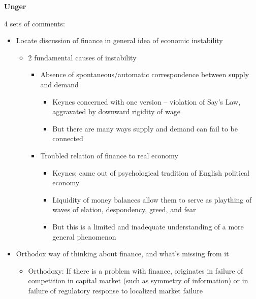 \textbf{Unger}

4 sets of comments:

\begin{itemize}
\tightlist
\item
  Locate discussion of finance in general idea of economic instability

  \begin{itemize}
  \tightlist
  \item
    2 fundamental causes of instability

    \begin{itemize}
    \tightlist
    \item
      Absence of spontaneous/automatic correspondence between supply and
      demand

      \begin{itemize}
      \tightlist
      \item
        Keynes concerned with one version -- violation of Say's Law,
        aggravated by downward rigidity of wage
      \item
        But there are many ways supply and demand can fail to be
        connected
      \end{itemize}
    \item
      Troubled relation of finance to real economy

      \begin{itemize}
      \tightlist
      \item
        Keynes: came out of psychological tradition of English political
        economy
      \item
        Liquidity of money balances allow them to serve as plaything of
        waves of elation, despondency, greed, and fear
      \item
        But this is a limited and inadequate understanding of a more
        general phenomenon
      \end{itemize}
    \end{itemize}
  \end{itemize}
\item
  Orthodox way of thinking about finance, and what's missing from it

  \begin{itemize}
  \tightlist
  \item
    Orthodoxy: If there is a problem with finance, originates in failure
    of competition in capital market (such as symmetry of information)
    or in failure of regulatory response to localized market failure


\end{itemize}
\end{itemize}
